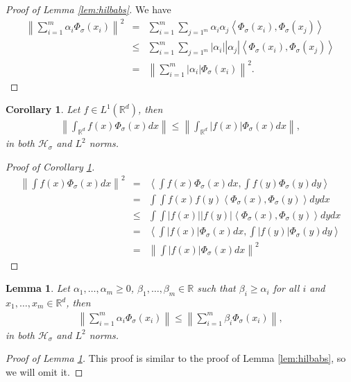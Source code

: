 \documentclass{article} %
\def\hsig{{\mathcal{H}_\sigma}}
\def\fm{{\Phi_\sigma}} %
\def\rn{\mathbb{R}}
\def\l{\left}
\def\r{\right}
\newtheorem{lem}{Lemma}
\newtheorem{cor}{Corollary}
\theoremstyle{definition}
\begin{document}
\begin{proof}[Proof of Lemma \ref{lem:hilbabs}]
	We have
	\begin{eqnarray*}
		\l\|\sum_{i=1}^m \alpha_i \fm\left( x_i \right)\r\|^2
		&=& \sum_{i=1}^m \sum_{j=1^m} \alpha_i \alpha_j \l<\fm(x_i), \fm(x_j)\r>\\
		       &\le& \sum_{i=1}^m \sum_{j=1^m} \l|\alpha_i\r| \l|\alpha_j\r| \l<\fm(x_i), \fm(x_j)\r>\\
			      &=& \l\|\sum_{i=1}^m \l|\alpha_i\r| \fm\left( x_i \right)\r\|^2.
	\end{eqnarray*}
\end{proof}
\begin{cor}\label{cor:hilbabs}
	Let $f\in L^1\left( \rn^d \right)$, then 
	\begin{eqnarray*}
		\l\|\int_{\rn^d} f(x) \fm(x) dx\r\| \le\l\|\int_{\rn^d} \l|f(x)\r| \fm(x) dx\r\|,
	\end{eqnarray*}
	in both $\hsig$ and $L^2$ norms.
\end{cor}
\begin{proof}[Proof of Corollary \ref{cor:hilbabs}]
	\begin{eqnarray*}
		\l\|\int f(x) \fm(x) dx\r\|^2
		&=& \l<\int f(x) \fm\left( x \right) dx , \int f(y) \fm \left( y \right) dy \r>\\
		       &=& \int \int f(x) f(y)\l< \fm\left( x \right)  ,  \fm \left( y \right)  \r>dydx\\
			      &\le& \int \int \l|f(x)\r| \l|f(y)\r|\l< \fm\left( x \right)  ,  \fm \left( y \right)  \r>dydx\\
			      &=& \l<\int \l|f(x)\r| \fm\left( x \right) dx , \int \l|f(y)\r| \fm \left( y \right) dy \r>\\
			      &=& \l\|\int \l|f(x)\r| \fm(x) dx\r\|^2
	\end{eqnarray*}
\end{proof}
\begin{lem}\label{lem:hilbbigger}
	Let $\alpha_1,\ldots,\alpha_m \ge 0$, $\beta_1,\ldots,\beta_m \in \rn$ such that $\beta_i \ge \alpha_i$ for all $i$ and $x_1,\ldots,x_m \in \rn^d$, then 
	\begin{eqnarray*}
		\l\|\sum_{i=1}^m \alpha_i \fm\left( x_i \right)\r\| \le \l\|\sum_{i=1}^m \beta_i \fm\left( x_i \right)\r\|,
	\end{eqnarray*}
	in both $\hsig$ and $L^2$ norms.
\end{lem}
\begin{proof}[Proof of Lemma \ref{lem:hilbbigger}]
	This proof is similar to the proof of Lemma \ref{lem:hilbabs}, so we will omit it.
\end{proof}
\end{document}
